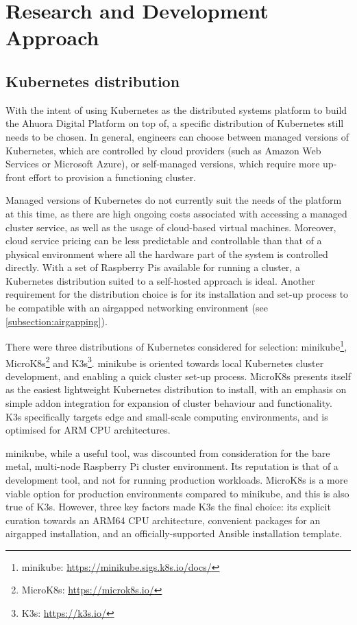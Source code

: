 \chapter{Research and Development Approach}

\section{Kubernetes distribution}

With the intent of using Kubernetes as the distributed systems platform to build the Ahuora Digital Platform on top of, a specific distribution of Kubernetes still needs to be chosen. In general, engineers can choose between managed versions of Kubernetes, which are controlled by cloud providers (such as Amazon Web Services or Microsoft Azure), or self-managed versions, which require more up-front effort to provision a functioning cluster.

Managed versions of Kubernetes do not currently suit the needs of the platform at this time, as there are high ongoing costs associated with accessing a managed cluster service, as well as the usage of cloud-based virtual machines. Moreover, cloud service pricing can be less predictable and controllable than that of a physical environment where all the hardware part of the system is controlled directly. With a set of Raspberry Pis available for running a cluster, a Kubernetes distribution suited to a self-hosted approach is ideal. Another requirement for the distribution choice is for its installation and set-up process to be compatible with an airgapped networking environment (see \ref{subsection:airgapping}).

There were three distributions of Kubernetes considered for selection: minikube\footnote{minikube: \url{https://minikube.sigs.k8s.io/docs/}}, MicroK8s\footnote{MicroK8s: \url{https://microk8s.io/}} and K3s\footnote{K3s: \url{https://k3s.io/}}. minikube is oriented towards local Kubernetes cluster development, and enabling a quick cluster set-up process. MicroK8s presents itself as the easiest lightweight Kubernetes distribution to install, with an emphasis on simple addon integration for expansion of cluster behaviour and functionality. K3s specifically targets edge and small-scale computing environments, and is optimised for ARM CPU architectures.

minikube, while a useful tool, was discounted from consideration for the bare metal, multi-node Raspberry Pi cluster environment. Its reputation is that of a development tool, and not for running production workloads. MicroK8s is a more viable option for production environments compared to minikube, and this is also true of K3s. However, three key factors made K3s the final choice: its explicit curation towards an ARM64 CPU architecture, convenient packages for an airgapped installation, and an officially-supported Ansible installation template.

